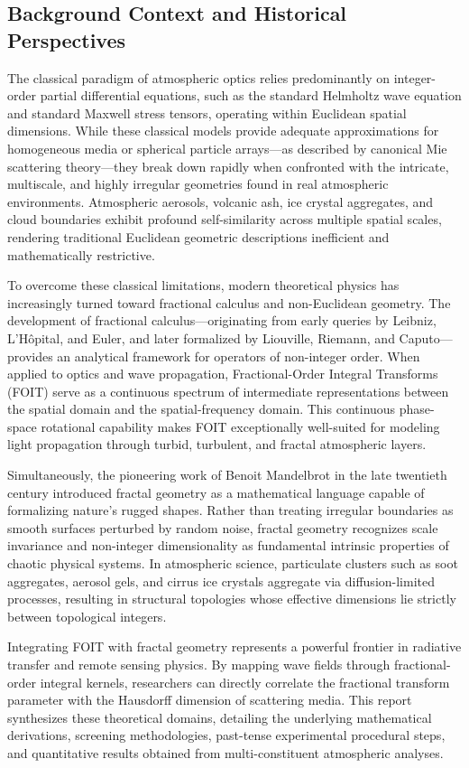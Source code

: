 \documentclass{article}
\begin{document}
\subsection{Background Context and Historical Perspectives}
The classical paradigm of atmospheric optics relies predominantly on integer-order partial differential equations, such as the standard Helmholtz wave equation and standard Maxwell stress tensors, operating within Euclidean spatial dimensions. While these classical models provide adequate approximations for homogeneous media or spherical particle arrays—as described by canonical Mie scattering theory—they break down rapidly when confronted with the intricate, multiscale, and highly irregular geometries found in real atmospheric environments. Atmospheric aerosols, volcanic ash, ice crystal aggregates, and cloud boundaries exhibit profound self-similarity across multiple spatial scales, rendering traditional Euclidean geometric descriptions inefficient and mathematically restrictive.

To overcome these classical limitations, modern theoretical physics has increasingly turned toward fractional calculus and non-Euclidean geometry. The development of fractional calculus—originating from early queries by Leibniz, L'Hôpital, and Euler, and later formalized by Liouville, Riemann, and Caputo—provides an analytical framework for operators of non-integer order. When applied to optics and wave propagation, Fractional-Order Integral Transforms (FOIT) serve as a continuous spectrum of intermediate representations between the spatial domain and the spatial-frequency domain. This continuous phase-space rotational capability makes FOIT exceptionally well-suited for modeling light propagation through turbid, turbulent, and fractal atmospheric layers.

Simultaneously, the pioneering work of Benoit Mandelbrot in the late twentieth century introduced fractal geometry as a mathematical language capable of formalizing nature's rugged shapes. Rather than treating irregular boundaries as smooth surfaces perturbed by random noise, fractal geometry recognizes scale invariance and non-integer dimensionality as fundamental intrinsic properties of chaotic physical systems. In atmospheric science, particulate clusters such as soot aggregates, aerosol gels, and cirrus ice crystals aggregate via diffusion-limited processes, resulting in structural topologies whose effective dimensions lie strictly between topological integers.

Integrating FOIT with fractal geometry represents a powerful frontier in radiative transfer and remote sensing physics. By mapping wave fields through fractional-order integral kernels, researchers can directly correlate the fractional transform parameter with the Hausdorff dimension of scattering media. This report synthesizes these theoretical domains, detailing the underlying mathematical derivations, screening methodologies, past-tense experimental procedural steps, and quantitative results obtained from multi-constituent atmospheric analyses.
\end{document}
